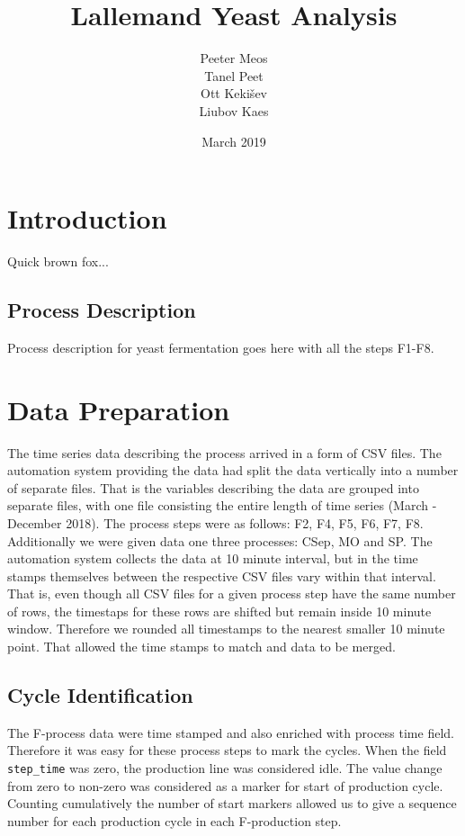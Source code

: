 \documentclass{article}
\title{Lallemand Yeast Analysis}
\author{Peeter Meos \\ Tanel Peet \\Ott Keki{\v s}ev \\ Liubov Kaes}
\date{March 2019}
\begin{document}
\maketitle

\tableofcontents

\section{Introduction}
Quick brown fox...
\subsection{Process Description}
Process description for yeast fermentation goes here with all the steps F1-F8.

\section{Data Preparation}
The time series data describing the process arrived in a form of CSV files. The automation system providing the data had split the data vertically into a number of separate files. That is the variables describing the data are grouped into separate files, with one file consisting the entire length of time series (March - December 2018). The process steps were as follows: F2, F4, F5, F6, F7, F8. Additionally we were given data one three processes: CSep, MO and SP. The automation system collects the data at 10 minute interval, but in the time stamps themselves between the respective CSV files vary within that interval. That is, even though all CSV files for a given process step have the same number of rows, the timestaps for these rows are shifted but remain inside 10 minute window. Therefore we rounded all timestamps to the nearest smaller 10 minute point. That allowed the time stamps to match and data to be merged.

\subsection{Cycle Identification}
The F-process data were time stamped and also enriched with process time field. Therefore it was easy for these process steps to mark the cycles. When the field \texttt{step\_time} was zero, the production line was considered idle. The value change from zero to non-zero was considered as a marker for start of production cycle. Counting cumulatively the number of start markers allowed us to give a sequence number for each production cycle in each F-production step.
\end{document}
